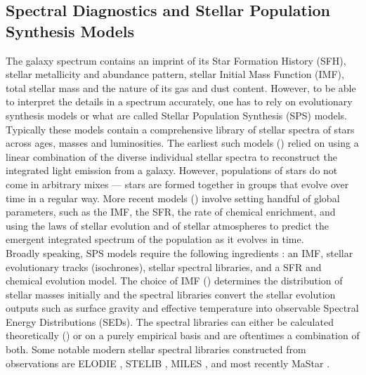 \subsection{Spectral Diagnostics and Stellar Population Synthesis Models}
\label{sed}

The galaxy spectrum contains an imprint of its Star Formation History (SFH), stellar metallicity and abundance pattern, stellar Initial Mass Function (IMF), total stellar mass and the nature of its gas and dust content. However, to be able to interpret the details in a spectrum accurately, one has to rely on evolutionary synthesis models or what are called Stellar Population Synthesis (SPS) models. Typically these models contain a comprehensive library of stellar spectra of stars across ages, masses and luminosities. The earliest such models (\citealt{1971ApJS...22..445S, faber_1972}) relied on using a linear combination of the diverse individual stellar spectra to reconstruct the integrated light emission from a galaxy. However,
populations of stars do not come in arbitrary mixes --- stars are formed
together in groups that evolve over time in a regular way. More 
recent models (\citealt{1995ApJS...96....9L, schulz_2002, bruzual_stellar_2003}) involve setting handful of global parameters,
such as the IMF, the SFR, the rate of chemical enrichment, and 
using the laws of stellar evolution and of stellar atmospheres to 
predict the emergent integrated spectrum of the population
as it evolves in time.\\

Broadly speaking, SPS models require the following ingredients \citep{walcher_2011}: an IMF, stellar evolutionary tracks (isochrones), stellar spectral libraries, and a SFR 
and chemical evolution model.
The choice of IMF (\citealt{1955ApJ...121..161S, 2001MNRAS.322..231K, 2003PASP..115..763C}) determines the distribution of stellar masses initially and the spectral libraries convert the stellar evolution outputs such as surface gravity and effective temperature into observable Spectral Energy Distributions (SEDs). The spectral libraries 
can either be calculated theoretically (\citealt{coelho_2005, martins_2005}) or on a purely empirical basis and are oftentimes a combination of both. Some notable modern stellar spectral libraries constructed from observations are ELODIE \citep{2004astro.ph..9214P}, STELIB \citep{leborgne_2003}, MILES \citep{2006MNRAS.371..703S}, 
and most recently MaStar \citep{yan19a}.

